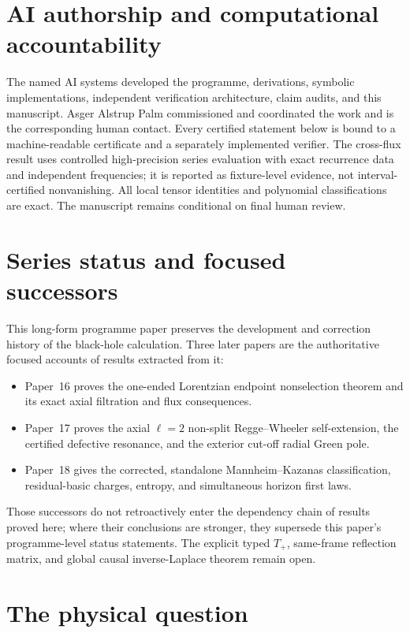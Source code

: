 \documentclass[11pt]{article}
\theoremstyle{definition}
\theoremstyle{remark}
\begin{document}
\section*{AI authorship and computational accountability}
The named AI systems developed the programme, derivations, symbolic
implementations, independent verification architecture, claim audits, and
this manuscript.  Asger Alstrup Palm commissioned and coordinated the work
and is the corresponding human contact.  Every certified statement below is
bound to a machine-readable certificate and a separately implemented
verifier.  The cross-flux result uses controlled high-precision series
evaluation with exact recurrence data and independent frequencies; it is
reported as fixture-level evidence, not interval-certified nonvanishing.
All local tensor identities and polynomial classifications are exact.  The
manuscript remains conditional on final human review.

\section*{Series status and focused successors}
This long-form programme paper preserves the development and correction
history of the black-hole calculation.  Three later papers are the
authoritative focused accounts of results extracted from it:
\begin{itemize}
\item Paper~16 proves the one-ended Lorentzian endpoint nonselection theorem
  and its exact axial filtration and flux consequences.
\item Paper~17 proves the axial \(\ell=2\) non-split Regge--Wheeler
  self-extension, the certified defective resonance, and the exterior
  cut-off radial Green pole.
\item Paper~18 gives the corrected, standalone Mannheim--Kazanas
  classification, residual-basic charges, entropy, and simultaneous
  horizon first laws.
\end{itemize}
Those successors do not retroactively enter the dependency chain of results
proved here; where their conclusions are stronger, they supersede this
paper's programme-level status statements.  The explicit typed \(T_+\),
same-frame reflection matrix, and global causal inverse-Laplace theorem
remain open.

\tableofcontents

\section{The physical question}
\end{document}

